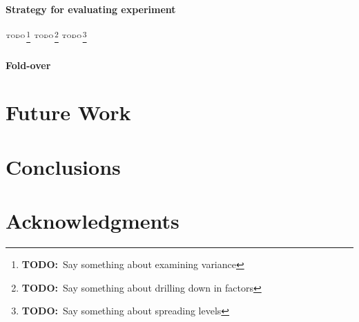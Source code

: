 \documentclass{article}
\newcommand{\todo}[1]{\ensuremath{^{\textrm{\tiny{TODO}\normalsize}}}\footnote{\textbf{TODO:}~#1}}
\begin{document}
\paragraph{Strategy for evaluating experiment}\todo{Say something
  about examining variance} \todo{Say something about drilling down in
  factors} \todo{Say something about spreading levels}

\paragraph{Fold-over}

\section{Future Work}


\section{Conclusions}



\section*{Acknowledgments}




%
%
%

\end{document}
